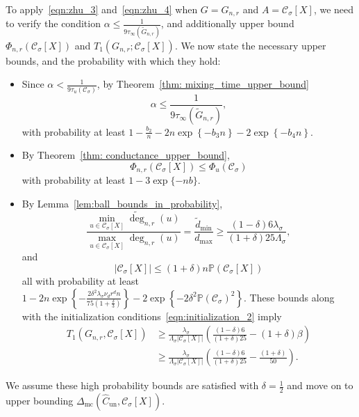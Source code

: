 \documentclass[11pt,twoside]{article}
\newcommand{\set}[1]{\left\{#1\right\}}
\newcommand{\abs}[1]{\left \lvert #1 \right \rvert}
\newcommand{\1}{\mathbbm{1}}
\newcommand{\Phibf}{\Phi_{u}}
\newcommand{\Xbf}{X}
\newcommand{\Pbb}{\mathbb{P}}
\newcommand{\Cset}{\mathcal{C}}
\newcommand{\Csig}{\Cset_{\sigma}}
\newcommand{\Cest}{\widehat{C}}
\newcommand{\degminwt}{\widetilde{d}_{\min}}
\newcommand{\degmax}{d_{\max}}
\begin{document}
To apply~\eqref{eqn:zhu_3} and~\eqref{eqn:zhu_4} when $G = G_{n,r}$ and $A = \Csig[\Xbf]$, we need to verify the condition $\alpha \leq \frac{1}{9\tau_{\infty}(\widetilde{G}_{n,r})}$, and additionally upper bound $\Phi_{n,r}(\Csig[\Xbf])$ and $T_1(G_{n,r}; \Csig[\Xbf])$. We now state the necessary upper bounds, and the probability with which they hold:
\begin{itemize}
	\item Since $\alpha < \frac{1}{9\tau_u(\Csig)}$, by Theorem~\ref{thm: mixing_time_upper_bound} 
	\begin{equation*}
	\alpha \leq \frac{1}{9\tau_{\infty}(\widetilde{G}_{n,r})},
	\end{equation*}
	with probability at least $1 - \frac{b_2}{n} - 2n\exp\set{-b_3n} - 2\exp\set{-b_4n}$. 
	\item  By Theorem~\ref{thm: conductance_upper_bound}, 
	\begin{equation*}
	\Phi_{n,r}(\Csig[\Xbf]) \leq \Phibf(\Csig) 
	\end{equation*}
	with probability at least $1 - 3\exp\{-nb\}$. 
	\item By Lemma~\ref{lem:ball_bounds_in_probability},
	\begin{equation*}
	\frac{\min_{u \in \Csig[\Xbf]}\widetilde{\deg}_{n,r}(u)}{\max_{u \in \Csig[\Xbf]}\deg_{n,r}(u)}= \frac{\degminwt}{\degmax} \geq \frac{(1 - \delta)6\lambda_{\sigma}}{(1+\delta)25\Lambda_{\sigma}},
	\end{equation*}
	and
	\begin{equation*}
	\abs{\Csig[\Xbf]} \leq (1 + \delta)n\Pbb(\Csig[\Xbf])
	\end{equation*}
	all with probability at least $1 - 2n\exp\set{-\frac{2 \delta^2 \lambda_{\sigma} \nu_d r^d n}{75(1 + \frac{\delta}{3})}} - 2\exp\set{-2\delta^2 \Pbb(\Csig)^2}$. These bounds along with the initialization conditions~\eqref{eqn:initialization_2} imply
	\begin{align}
	T_1(G_{n,r}, \Csig[\Xbf]) & \geq \frac{\lambda_{\sigma}}{\Lambda_{\sigma}\abs{\Csig[\Xbf]}}\left(\frac{(1 - \delta)6}{(1+\delta)25} - (1 + \delta)\beta\right) \nonumber \\
	& \geq \frac{\lambda_{\sigma}}{\Lambda_{\sigma}\abs{\Csig[\Xbf]}}\left(\frac{(1 - \delta)6}{(1+\delta)25} - \frac{(1 + \delta)}{50}\right). \label{eqn:misclassification_rate_pf1}
	\end{align}
\end{itemize}
We assume these high probability bounds are satisfied with $\delta = \frac{1}{2}$ and move on to upper bounding $\Delta_{\textrm{mc}}(\Cest_{\textrm{un}}, \Csig[\Xbf])$. 
\end{document}
